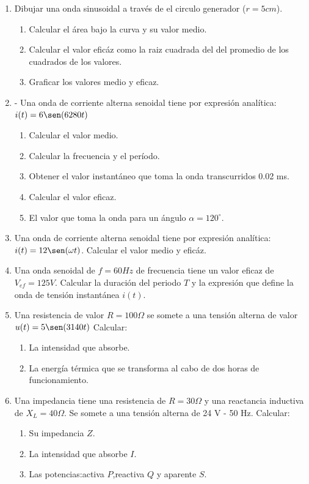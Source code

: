 \documentclass[../main]{subfiles}
\begin{document}


\begin{enumerate}
    \item Dibujar una onda sinusoidal a través de el circulo generador ($r=5cm$).
    \begin{enumerate}
        \item Calcular el área bajo la curva y su valor medio.
        \item Calcular el valor eficáz como la raiz cuadrada del del promedio de los cuadrados de los valores.
        \item Graficar los valores medio y eficaz.
        
    \end{enumerate}
 \item - Una onda de corriente alterna senoidal tiene por expresión analítica: $i(t)=6 \sen(6280 t)$
    \begin{enumerate}
        \item Calcular el valor medio.
        \item Calcular la frecuencia y el período.
        \item Obtener el valor instantáneo que toma la onda transcurridos 0.02 ms.
        \item Calcular el valor eficaz.
        \item El valor que toma la onda para un ángulo $\alpha = 120^\circ$.
    \end{enumerate}

\item Una onda de corriente alterna senoidal tiene por expresión analítica:
$i(t)=12\sen(\omega t)$. Calcular el valor medio y eficáz.
\item Una onda senoidal de $f=60Hz$ de frecuencia tiene un valor eficaz de $V_{ef}=125V$. Calcular la duración del periodo $T$ y la expresión que define la onda de tensión instantánea $i(t)$.
\item Una resistencia de valor $R=100\Omega$ se somete a una tensión alterna de valor
$u(t)=5\sen(3140 t)$
Calcular:
\begin{enumerate}
    \item La intensidad que absorbe.
    \item La energía térmica que se transforma al cabo de dos horas de funcionamiento.
\end{enumerate}
\item Una impedancia tiene una resistencia de $R=30\Omega$ y una reactancia inductiva de $X_L=40\Omega$. Se
somete a una tensión alterna de 24 V - 50 Hz. Calcular:
\begin{enumerate}
    \item Su impedancia $Z$.
\item La intensidad que absorbe $I$.
\item Las potencias:activa $P$,reactiva $Q$ y aparente $S$.
 

\end{enumerate}
\end{enumerate}
\end{document}

